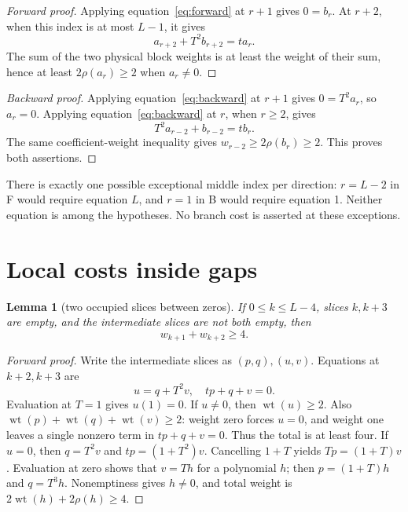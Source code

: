 \documentclass{article}
\newtheorem{lemma}{Lemma}
\DeclareMathOperator{\wt}{wt}
\begin{document}
\begin{proof}[Forward proof]
  Applying equation~\eqref{eq:forward} at \(r + 1\) gives \(0 = b_r\). At \(r + 2\), when this
  index is at most \(L-1\), it gives
  \begin{equation}
    a_{r+2} + T^2 b_{r+2} = t a_r.
  \end{equation}
  The sum of the two physical block weights is at least the weight of their sum, hence at least
  \(2\rho(a_r) \ge 2\) when \(a_r \ne 0\).
\end{proof}

\begin{proof}[Backward proof]
  Applying equation~\eqref{eq:backward} at \(r + 1\) gives \(0 = T^2 a_r\), so \(a_r = 0\).
  Applying equation~\eqref{eq:backward} at \(r\), when \(r \ge 2\), gives
  \begin{equation}
    T^2 a_{r-2} + b_{r-2} = t b_r.
  \end{equation}
  The same coefficient-weight inequality gives \(w_{r-2} \ge 2\rho(b_r) \ge 2\). This proves both
  assertions.
\end{proof}

There is exactly one possible exceptional middle index per direction: \(r = L-2\) in F would
require equation \(L\), and \(r = 1\) in B would require equation 1. Neither equation is among the
hypotheses. No branch cost is asserted at these exceptions.

\section{Local costs inside gaps}\label{sec:gaps}

\begin{lemma}[two occupied slices between zeros]\label{lem:two}
  If \(0 \le k \le L-4\), slices \(k, k + 3\) are empty, and the intermediate slices are not both
  empty, then
  \begin{equation}
    w_{k+1} + w_{k+2} \ge 4.
  \end{equation}
\end{lemma}

\begin{proof}[Forward proof]
  Write the intermediate slices as \((p,q), (u,v)\). Equations at \(k + 2, k + 3\) are
  \begin{equation}
    u = q + T^2 v, \quad tp + q + v = 0.
  \end{equation}
  Evaluation at \(T = 1\) gives \(u(1) = 0\). If \(u \ne 0\), then \(\wt(u) \ge 2\). Also
  \(\wt(p) + \wt(q) + \wt(v) \ge 2\): weight zero forces \(u = 0\), and weight one leaves a single
  nonzero term in \(tp + q + v = 0\). Thus the total is at least four. If \(u = 0\), then
  \(q = T^2 v\) and \(tp = (1 + T^2)v\). Cancelling \(1 + T\) yields \(Tp = (1 + T)v\). Evaluation
  at zero shows that \(v = Th\) for a polynomial \(h\); then \(p = (1 + T)h\) and \(q = T^3 h\).
  Nonemptiness gives \(h \ne 0\), and total weight is \(2\wt(h) + 2\rho(h) \ge 4\).
\end{proof}
\end{document}
